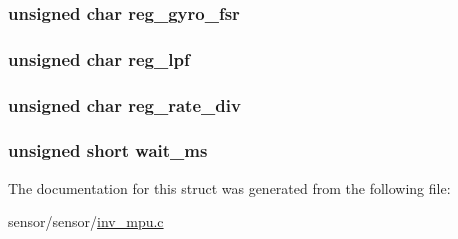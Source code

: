 \subsubsection[{\texorpdfstring{reg\+\_\+gyro\+\_\+fsr}{reg_gyro_fsr}}]{\setlength{\rightskip}{0pt plus 5cm}unsigned char reg\+\_\+gyro\+\_\+fsr}\hypertarget{structtest__s_a6063bc7c719cdaddf88633b1148fd323}{}\label{structtest__s_a6063bc7c719cdaddf88633b1148fd323}
\subsubsection[{\texorpdfstring{reg\+\_\+lpf}{reg_lpf}}]{\setlength{\rightskip}{0pt plus 5cm}unsigned char reg\+\_\+lpf}\hypertarget{structtest__s_a794ee75f43ca70e89a68b43642eb2c59}{}\label{structtest__s_a794ee75f43ca70e89a68b43642eb2c59}
\subsubsection[{\texorpdfstring{reg\+\_\+rate\+\_\+div}{reg_rate_div}}]{\setlength{\rightskip}{0pt plus 5cm}unsigned char reg\+\_\+rate\+\_\+div}\hypertarget{structtest__s_a82f9074fa4cc93f3d21f826a9e739294}{}\label{structtest__s_a82f9074fa4cc93f3d21f826a9e739294}
\subsubsection[{\texorpdfstring{wait\+\_\+ms}{wait_ms}}]{\setlength{\rightskip}{0pt plus 5cm}unsigned short wait\+\_\+ms}\hypertarget{structtest__s_a0abed830f8dc38c7bd17ce78ee2530d8}{}\label{structtest__s_a0abed830f8dc38c7bd17ce78ee2530d8}


The documentation for this struct was generated from the following file\+:\begin{DoxyCompactItemize}
\item 
sensor/sensor/\hyperlink{inv__mpu_8c}{inv\+\_\+mpu.\+c}\end{DoxyCompactItemize}
